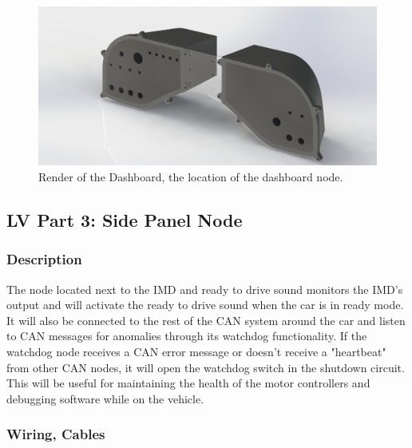 \documentclass{article}
\begin{document}
            \begin{figure}[H]
            \centering
            \includegraphics[width = 0.7 \textwidth]{Dashboard}
            \caption{Render of the Dashboard, the location of the dashboard node. }
            \label{dashboard}
            \end{figure}

    \subsection{LV Part 3: Side Panel Node} \label{imdnode}

        \subsubsection{Description}

            The node located next to the IMD and ready to drive sound monitors the IMD's output and will activate the ready to drive sound when the car is in ready mode. It will also be connected to the rest of the CAN system around the car and listen to CAN messages for anomalies through its watchdog functionality. If the watchdog node receives a CAN error message or doesn't receive a "heartbeat" from other CAN nodes, it will open the watchdog switch in the shutdown circuit. This will be useful for maintaining the health of the motor controllers and debugging software while on the vehicle.

        \subsubsection{Wiring, Cables}
\end{document}
